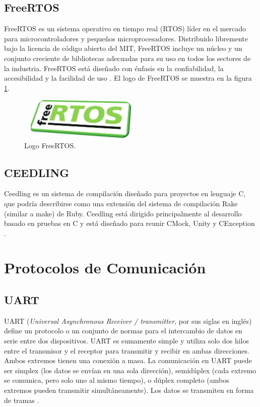 \subsection{FreeRTOS}
\label{subsec:FreeRTOS}
FreeRTOS es un sistema operativo en tiempo real (RTOS) líder en el mercado para microcontroladores y pequeños microprocesadores. Distribuido libremente bajo la licencia de código abierto del MIT, FreeRTOS incluye un núcleo y un conjunto creciente de bibliotecas adecuadas para su uso en todos los sectores de la industria.
FreeRTOS está diseñado con énfasis en la confiabilidad, la accesibilidad y la facilidad de uso \citep{FreeRTOS}. El logo de FreeRTOS se muestra en la figura \ref{fig:FreeRTOS}.
\begin{figure}[htbp]
	\centering
	\includegraphics[width=6cm, height=2cm]{./Figures/logo_FreeRTOS.png}
	\caption{Logo FreeRTOS\protect\footnotemark.}
	\label{fig:FreeRTOS}
\end{figure}
\subsection{CEEDLING}
Ceedling es un sistema de compilación diseñado para proyectos en lenguaje C, que podría describirse como una extensión del sistema de compilación Rake (similar a make) de Ruby. Ceedling está dirigido principalmente al desarrollo basado en pruebas en C y está diseñado para reunir CMock, Unity y CException \citep{CEEDLING}.

\section{Protocolos de Comunicación}
\subsection{UART}
UART (\textit{Universal Asynchronous Receiver / transmitter}, por sus siglas en inglés) define un protocolo o un conjunto de normas para el intercambio de datos en serie entre dos dispositivos. UART es sumamente simple y utiliza solo dos hilos entre el transmisor y el receptor para transmitir y recibir en ambas direcciones. Ambos extremos tienen una conexión a masa. La comunicación en UART puede ser simplex (los datos se envían en una sola dirección), semidúplex (cada extremo se comunica, pero solo uno al mismo tiempo), o dúplex completo (ambos extremos pueden transmitir simultáneamente). Los datos se transmiten en forma de tramas \citep{UART}.
